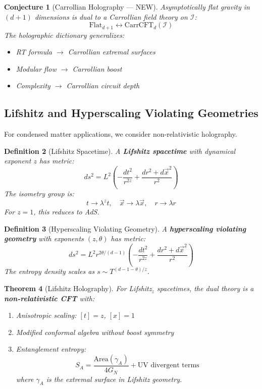 \documentclass[12pt,a4paper]{article}
\newtheorem{theorem}{Theorem}[section]
\newtheorem{conjecture}[theorem]{Conjecture}
\newtheorem{definition}[theorem]{Definition}
\begin{document}
\begin{conjecture}[Carrollian Holography --- NEW]
Asymptotically flat gravity in $(d+1)$ dimensions is dual to a Carrollian field theory on $\mathcal{I}$:
\begin{equation}
\text{Flat}_{d+1} \longleftrightarrow \text{CarrCFT}_d(\mathcal{I})
\end{equation}
The holographic dictionary generalizes:
\begin{itemize}
    \item RT formula $\to$ Carrollian extremal surfaces
    \item Modular flow $\to$ Carrollian boost
    \item Complexity $\to$ Carrollian circuit depth
\end{itemize}
\end{conjecture}

\subsection{Lifshitz and Hyperscaling Violating Geometries}

For condensed matter applications, we consider non-relativistic holography.

\begin{definition}[Lifshitz Spacetime]
A \textbf{Lifshitz spacetime} with dynamical exponent $z$ has metric:
\begin{equation}
ds^2 = L^2 \left( -\frac{dt^2}{r^{2z}} + \frac{dr^2 + d\vec{x}^2}{r^2} \right)
\end{equation}
The isometry group is:
\begin{equation}
t \to \lambda^z t, \quad \vec{x} \to \lambda \vec{x}, \quad r \to \lambda r
\end{equation}
For $z = 1$, this reduces to AdS.
\end{definition}

\begin{definition}[Hyperscaling Violating Geometry]
A \textbf{hyperscaling violating geometry} with exponents $(z, \theta)$ has metric:
\begin{equation}
ds^2 = L^2 r^{2\theta/(d-1)} \left( -\frac{dt^2}{r^{2z}} + \frac{dr^2 + d\vec{x}^2}{r^2} \right)
\end{equation}
The entropy density scales as $s \sim T^{(d-1-\theta)/z}$.
\end{definition}

\begin{theorem}[Lifshitz Holography]
For Lifshitz$_{z}$ spacetimes, the dual theory is a \textbf{non-relativistic CFT} with:
\begin{enumerate}
    \item Anisotropic scaling: $[t] = z$, $[x] = 1$
    \item Modified conformal algebra without boost symmetry
    \item Entanglement entropy:
    \begin{equation}
    S_A = \frac{\text{Area}(\gamma_A)}{4G_N} + \text{UV divergent terms}
    \end{equation}
    where $\gamma_A$ is the extremal surface in Lifshitz geometry.
\end{enumerate}
\end{theorem}
\end{document}
